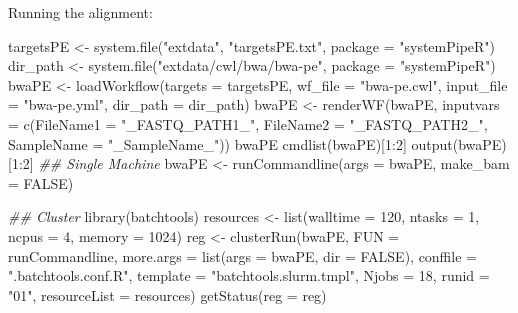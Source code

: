 \documentclass[14pt,]{article}
\newcommand{\hlnum}[1]{\textcolor[rgb]{0.816,0.125,0.439}{#1}}%
\newcommand{\hlstr}[1]{\textcolor[rgb]{0.251,0.627,0.251}{#1}}%
\newcommand{\hlcom}[1]{\textcolor[rgb]{0.502,0.502,0.502}{\textit{#1}}}%
\newcommand{\hlstd}[1]{\textcolor[rgb]{0.251,0.251,0.251}{#1}}%
\newenvironment{Shaded}{\begin{myshaded}}{\end{myshaded}}
\newcommand{\DecValTok}[1]{\hlnum{#1}}
\newcommand{\ConstantTok}[1]{\hlnum{#1}}
\newcommand{\SpecialCharTok}[1]{\hlstr{#1}}
\newcommand{\StringTok}[1]{\hlstr{#1}}
\newcommand{\DocumentationTok}[1]{\hlcom{#1}}
\newcommand{\OtherTok}[1]{{#1}}
\newcommand{\FunctionTok}[1]{\hlstd{#1}}
\newcommand{\AttributeTok}[1]{{#1}}
\newcommand{\NormalTok}[1]{\hlstd{#1}}
\begin{document}
Running the alignment:

\begin{Shaded}
\begin{Highlighting}[]
\NormalTok{targetsPE }\OtherTok{\textless{}{-}} \FunctionTok{system.file}\NormalTok{(}\StringTok{"extdata"}\NormalTok{, }\StringTok{"targetsPE.txt"}\NormalTok{, }\AttributeTok{package =} \StringTok{"systemPipeR"}\NormalTok{)}
\NormalTok{dir\_path }\OtherTok{\textless{}{-}} \FunctionTok{system.file}\NormalTok{(}\StringTok{"extdata/cwl/bwa/bwa{-}pe"}\NormalTok{, }\AttributeTok{package =} \StringTok{"systemPipeR"}\NormalTok{)}
\NormalTok{bwaPE }\OtherTok{\textless{}{-}} \FunctionTok{loadWorkflow}\NormalTok{(}\AttributeTok{targets =}\NormalTok{ targetsPE, }\AttributeTok{wf\_file =} \StringTok{"bwa{-}pe.cwl"}\NormalTok{, }\AttributeTok{input\_file =} \StringTok{"bwa{-}pe.yml"}\NormalTok{, }
    \AttributeTok{dir\_path =}\NormalTok{ dir\_path)}
\NormalTok{bwaPE }\OtherTok{\textless{}{-}} \FunctionTok{renderWF}\NormalTok{(bwaPE, }\AttributeTok{inputvars =} \FunctionTok{c}\NormalTok{(}\AttributeTok{FileName1 =} \StringTok{"\_FASTQ\_PATH1\_"}\NormalTok{, }\AttributeTok{FileName2 =} \StringTok{"\_FASTQ\_PATH2\_"}\NormalTok{, }
    \AttributeTok{SampleName =} \StringTok{"\_SampleName\_"}\NormalTok{))}
\NormalTok{bwaPE}
\FunctionTok{cmdlist}\NormalTok{(bwaPE)[}\DecValTok{1}\SpecialCharTok{:}\DecValTok{2}\NormalTok{]}
\FunctionTok{output}\NormalTok{(bwaPE)[}\DecValTok{1}\SpecialCharTok{:}\DecValTok{2}\NormalTok{]}
\DocumentationTok{\#\# Single Machine}
\NormalTok{bwaPE }\OtherTok{\textless{}{-}} \FunctionTok{runCommandline}\NormalTok{(}\AttributeTok{args =}\NormalTok{ bwaPE, }\AttributeTok{make\_bam =} \ConstantTok{FALSE}\NormalTok{)}

\DocumentationTok{\#\# Cluster}
\FunctionTok{library}\NormalTok{(batchtools)}
\NormalTok{resources }\OtherTok{\textless{}{-}} \FunctionTok{list}\NormalTok{(}\AttributeTok{walltime =} \DecValTok{120}\NormalTok{, }\AttributeTok{ntasks =} \DecValTok{1}\NormalTok{, }\AttributeTok{ncpus =} \DecValTok{4}\NormalTok{, }\AttributeTok{memory =} \DecValTok{1024}\NormalTok{)}
\NormalTok{reg }\OtherTok{\textless{}{-}} \FunctionTok{clusterRun}\NormalTok{(bwaPE, }\AttributeTok{FUN =}\NormalTok{ runCommandline, }\AttributeTok{more.args =} \FunctionTok{list}\NormalTok{(}\AttributeTok{args =}\NormalTok{ bwaPE, }\AttributeTok{dir =} \ConstantTok{FALSE}\NormalTok{), }
    \AttributeTok{conffile =} \StringTok{".batchtools.conf.R"}\NormalTok{, }\AttributeTok{template =} \StringTok{"batchtools.slurm.tmpl"}\NormalTok{, }\AttributeTok{Njobs =} \DecValTok{18}\NormalTok{, }
    \AttributeTok{runid =} \StringTok{"01"}\NormalTok{, }\AttributeTok{resourceList =}\NormalTok{ resources)}
\FunctionTok{getStatus}\NormalTok{(}\AttributeTok{reg =}\NormalTok{ reg)}
\end{Highlighting}
\end{Shaded}
\end{document}
